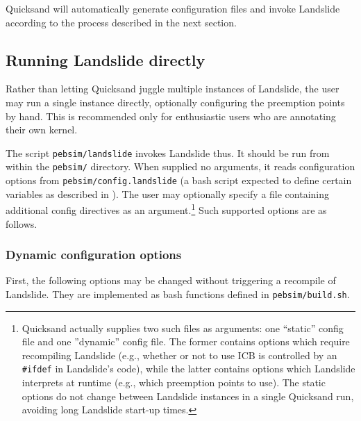 Quicksand will automatically generate configuration files and invoke Landslide according to the process described in the next section.


\subsection{Running Landslide directly}
\label{sec:landslide-directly}

Rather than letting Quicksand juggle multiple instances of Landslide,
the user may run a single instance directly, optionally configuring the preemption points by hand.
This is recommended only for enthusiastic users who are annotating their own kernel.

The script {\tt pebsim/landslide} invokes Landslide thus.
It should be run from within the {\tt pebsim/} directory.
When supplied no arguments, it reads configuration options from {\tt pebsim/config.landslide}
(a bash script expected to define certain variables as described in \sect{\ref{sec:landslide-glue}}).
The user may optionally specify a file containing additional config directives
as an argument.\footnote{
Quicksand actually supplies two such files as arguments: one ``static'' config file and one ''dynamic'' config file.
The former contains options which require recompiling Landslide (e.g., whether or not to use ICB is controlled by an {\tt \#ifdef} in Landslide's code),
while the latter contains options which Landslide interprets at runtime (e.g., which preemption points to use).
The static options do not change between Landslide instances in a single Quicksand run,
avoiding long Landslide start-up times.
}
Such supported options are as follows.

\subsubsection{Dynamic configuration options}
\label{sec:landslide-dynamicconfig}

First, the following options may be changed without triggering a recompile of Landslide.
They are implemented as bash functions defined in {\tt pebsim/build.sh}.

